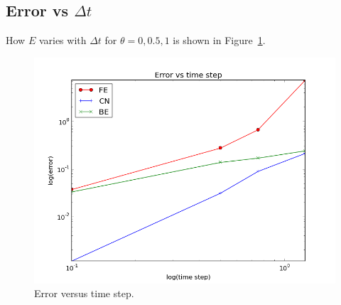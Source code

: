 \documentclass[twoside]{book}
\begin{document}
\subsection{Error vs $\Delta t$}



How $E$ varies with $\Delta t$ for $\theta=0,0.5,1$
is shown in Figure~\ref{fig:E}.


\begin{figure}[!ht]
  \centerline{\includegraphics[width=0.9\linewidth]{error.png}}
  \caption{
  Error versus time step. \label{fig:E}
  }
\end{figure}

\printindex
\end{document}
